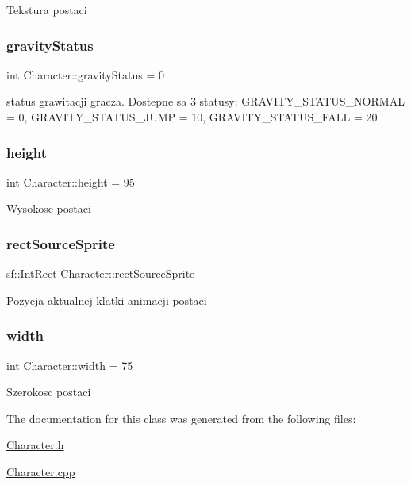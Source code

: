 Tekstura postaci \mbox{\label{class_character_a40b71119c7b457c7fec3a90a012da631}} 
\subsubsection{\texorpdfstring{gravity\+Status}{gravityStatus}}
{\footnotesize\ttfamily int Character\+::gravity\+Status = 0}

status grawitacji gracza. Dostepne sa 3 statusy\+: G\+R\+A\+V\+I\+T\+Y\+\_\+\+S\+T\+A\+T\+U\+S\+\_\+\+N\+O\+R\+M\+AL = 0, G\+R\+A\+V\+I\+T\+Y\+\_\+\+S\+T\+A\+T\+U\+S\+\_\+\+J\+U\+MP = 10, G\+R\+A\+V\+I\+T\+Y\+\_\+\+S\+T\+A\+T\+U\+S\+\_\+\+F\+A\+LL = 20 \mbox{\label{class_character_a1f7e996c91a75a5e037bebcf0bf3ac06}} 
\subsubsection{\texorpdfstring{height}{height}}
{\footnotesize\ttfamily int Character\+::height = 95}

Wysokosc postaci \mbox{\label{class_character_a8461b99479fbc94d4b001b61f49bcafe}} 
\subsubsection{\texorpdfstring{rect\+Source\+Sprite}{rectSourceSprite}}
{\footnotesize\ttfamily sf\+::\+Int\+Rect Character\+::rect\+Source\+Sprite}

Pozycja aktualnej klatki animacji postaci \mbox{\label{class_character_aa945d94f4ee6ec02e5cf1fb753c94d8f}} 
\subsubsection{\texorpdfstring{width}{width}}
{\footnotesize\ttfamily int Character\+::width = 75}

Szerokosc postaci 

The documentation for this class was generated from the following files\+:\begin{DoxyCompactItemize}
\item 
\hyperlink{_character_8h}{Character.\+h}\item 
\hyperlink{_character_8cpp}{Character.\+cpp}\end{DoxyCompactItemize}
